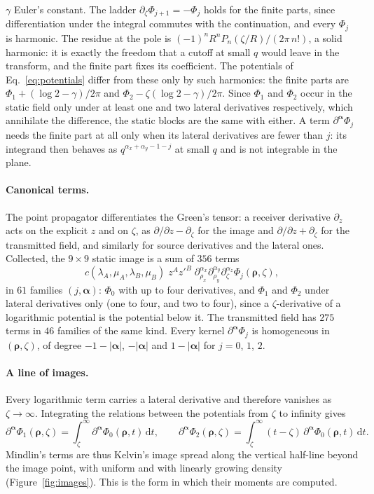 \documentclass[11pt,a4paper]{article}
\newcommand{\balpha}{\boldsymbol{\alpha}}
\newcommand{\brho}{\boldsymbol{\rho}}
\newcommand{\dd}{\mathrm{d}}
\begin{document}
$\gamma$ Euler's constant. The ladder $\partial_\zeta\Phi_{j+1}=-\Phi_j$ holds for the finite parts, since
differentiation under the integral commutes with the continuation, and every $\Phi_j$ is harmonic. The residue
at the pole is $(-1)^nR^nP_n(\zeta/R)/(2\pi\,n!)$, a solid harmonic: it is exactly the freedom that a cutoff
at small $q$ would leave in the transform, and the finite part fixes its coefficient. The potentials of
Eq.~\eqref{eq:potentials} differ from these only by such harmonics: the finite parts are
$\Phi_1+(\log2-\gamma)/2\pi$ and $\Phi_2-\zeta(\log2-\gamma)/2\pi$. Since $\Phi_1$ and $\Phi_2$ occur in the
static field only under at least one and two lateral derivatives respectively, which annihilate the
difference, the static blocks are the same with either. A term $\partial^{\balpha}\Phi_j$ needs the finite part at all only
when its lateral derivatives are fewer than $j$: its integrand then behaves as $q^{\alpha_x+\alpha_y-1-j}$ at
small $q$ and is not integrable in the plane.

\paragraph{Canonical terms.} The point propagator differentiates the Green's tensor: a receiver derivative
$\partial_z$ acts on the explicit $z$ and on $\zeta$, as $\partial/\partial z-\partial_\zeta$ for the image and
$\partial/\partial z+\partial_\zeta$ for the transmitted field, and similarly for source derivatives and the
lateral ones. Collected, the $9\times9$ static image is a sum of $356$ terms
\begin{equation}\label{eq:imageterms}
  c(\lambda_A,\mu_A,\lambda_B,\mu_B)\;z^{A}z'^{B}\;\partial_{\rho_x}^{\alpha_x}\partial_{\rho_y}^{\alpha_y}
  \partial_\zeta^{\alpha_z}\Phi_j(\brho,\zeta),
\end{equation}
in $61$ families $(j,\balpha)$: $\Phi_0$ with up to four derivatives, and $\Phi_1$ and $\Phi_2$ under lateral
derivatives only (one to four, and two to four), since a $\zeta$-derivative of a logarithmic potential is
the potential below it. The transmitted field has $275$ terms in $46$ families of the same kind. Every kernel
$\partial^{\balpha}\Phi_j$ is homogeneous in $(\brho,\zeta)$, of degree $-1-|\balpha|$, $-|\balpha|$ and
$1-|\balpha|$ for $j=0$, $1$, $2$.

\paragraph{A line of images.} Every logarithmic term carries a lateral derivative and therefore vanishes as
$\zeta\to\infty$. Integrating the relations between the potentials from $\zeta$ to infinity gives
\begin{equation}\label{eq:lineofimages}
  \partial^{\balpha}\Phi_1(\brho,\zeta)=\int_\zeta^\infty\partial^{\balpha}\Phi_0(\brho,t)\,\dd t,\qquad
  \partial^{\balpha}\Phi_2(\brho,\zeta)=\int_\zeta^\infty(t-\zeta)\,\partial^{\balpha}\Phi_0(\brho,t)\,\dd t.
\end{equation}
Mindlin's terms are thus Kelvin's image spread along the vertical half-line beyond the image point, with
uniform and with linearly growing density (Figure~\ref{fig:images}). This is the form in which their moments
are computed.
\end{document}
